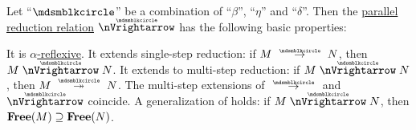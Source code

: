 \begin{proposition}\label{thm:def:parallel_reduction}
  Let \enquote{\( {\Anon} \)} be a combination of \enquote{\( \beta \)}, \enquote{\( \eta \)} and \enquote{\( \delta \)}. Then the \hyperref[def:parallel_reduction]{parallel reduction relation} \( {\ppred} \) has the following basic properties:
  \begin{thmenum}
     It is \hyperref[def:alpha_reflexive]{\( \alpha \)-reflexive}.
     It extends single-step reduction: if \( M \pred N \), then \( M \ppred N \).
     It extends to multi-step reduction: if \( M \ppred N \), then \( M \pred* N \).
     The multi-step extensions of \( {\pred} \) and \( {\ppred} \) coincide.
     A generalization of  holds: if \( M \ppred N \), then \( \op*{Free}(M) \supseteq \op*{Free}(N) \).
  \end{thmenum}
\end{proposition}
